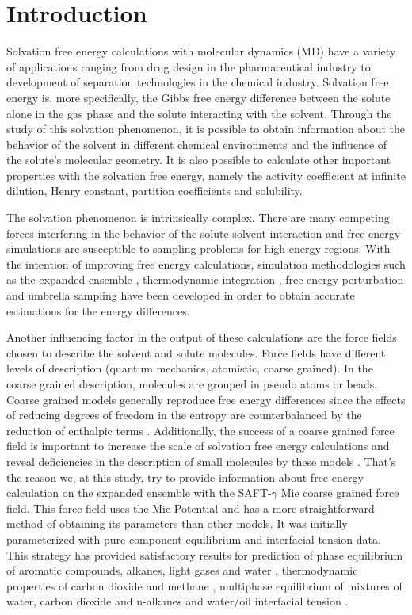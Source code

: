 \chapter{Introduction} %

\label{Chapter1} %
Solvation free energy calculations with molecular dynamics (MD) have a variety of applications ranging from drug design in the pharmaceutical industry to development of separation technologies in the chemical industry. Solvation free energy is, more specifically, the Gibbs free energy difference between the solute alone in the gas phase and the solute interacting with the solvent. Through the study of this solvation phenomenon, it is possible to obtain information about the behavior of the solvent in different chemical environments and the influence of the solute's molecular geometry. It is also possible to calculate other important properties with the solvation free energy, namely the activity coefficient at infinite dilution, Henry constant, partition coefficients and solubility. 

The solvation phenomenon is intrinsically complex. There are many competing forces interfering in the behavior of the solute-solvent interaction and free energy simulations are susceptible to sampling problems for high energy regions. With the intention of improving free energy calculations, simulation methodologies such as the expanded ensemble \cite{lyubartsev}, thermodynamic integration \cite{kirkwood1935}, free energy perturbation \cite{zwanzig1954,bennet1976,mbar} and umbrella sampling \cite{TORRIE1977187} have been developed in order to obtain accurate estimations for the energy differences. 

Another influencing factor in the output of these calculations are the force fields chosen to describe the solvent and solute molecules. Force fields have different levels of description (quantum mechanics, atomistic, coarse grained). In the coarse grained description, molecules are grouped in pseudo atoms or beads. Coarse grained models generally reproduce free energy differences since the effects of reducing degrees of freedom in the entropy are counterbalanced by the reduction of enthalpic terms \cite{kmiecik2016}. Additionally, the success of a coarse grained force field is important to increase the scale of solvation free energy calculations and reveal deficiencies in the description of small molecules by these models \cite{mobley2007,shirts2013}. That's the reason we, at this study, try to provide information about free energy calculation on the expanded ensemble with the SAFT-$\gamma$ Mie coarse grained force field. This force field uses the Mie Potential \cite{MIE} and has a more straightforward method of obtaining its parameters than other models. It was initially parameterized with pure component equilibrium and interfacial tension data. This strategy has provided satisfactory results for prediction of phase equilibrium of aromatic compounds, alkanes, light gases and water \cite{herdes2015,muller2017,lobanova2015} , thermodynamic properties of carbon dioxide and methane \cite{cassiano1}, multiphase equilibrium of mixtures of water, carbon dioxide and n-alkanes \cite{lobanova2016} and water/oil interfacial tension \cite{herdes2017}. 

